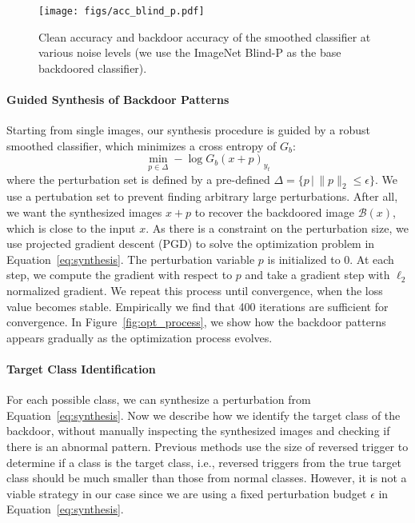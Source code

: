 \documentclass[10pt,twocolumn,letterpaper]{article}
\begin{document}
\begin{figure}[t!]
\centering 
\texttt{[image: figs/acc\_blind\_p.pdf]}
\caption{Clean accuracy and backdoor accuracy of the smoothed classifier at various noise levels (we use the ImageNet Blind-P as the base backdoored classifier).}
\label{fig:acc_blind_p}
\end{figure}


\paragraph{Guided Synthesis of Backdoor Patterns} Starting from single images, our synthesis procedure is guided by a robust smoothed classifier, which minimizes a cross entropy of $G_{b}$:
 \begin{equation}\label{eq:synthesis}
     \min_{p \in \Delta} -\log G_{b}(x+p)_{y_{t}}
 \end{equation}
 where the perturbation set is defined by a pre-defined $\Delta = \{p\, |\, \|p\|_{2}\le \epsilon\}$. 
We use a pertubation set to prevent finding arbitrary large perturbations. After all, we want the synthesized images $x+p$ to recover the backdoored image $\mathcal{B}(x)$, which is close to the input $x$. As there is a constraint on the perturbation size, we use projected gradient descent (PGD) to solve the optimization problem in Equation~\ref{eq:synthesis}. The perturbation variable $p$ is initialized to 0. At each step, we compute the gradient with respect to $p$ and take a gradient step with $\ell_2$ normalized gradient. We repeat this process until convergence, when the loss value becomes stable. Empirically we find that 400 iterations are sufficient for convergence.  In Figure~\ref{fig:opt_process}, we show how the backdoor patterns appears gradually as the optimization process evolves.



 
\paragraph{Target Class Identification} For each possible class, we can synthesize a perturbation from Equation~\ref{eq:synthesis}. Now we describe how we identify the target class of the backdoor, without manually inspecting the synthesized images and checking if there is an abnormal pattern. Previous methods use the size of reversed trigger to determine if a class is the target class, i.e.,  reversed triggers from the true target class should be much smaller than those from normal classes. However, it is not a viable strategy in our case since we are using a fixed perturbation budget $\epsilon$ in Equation~\ref{eq:synthesis}. 
\end{document}

